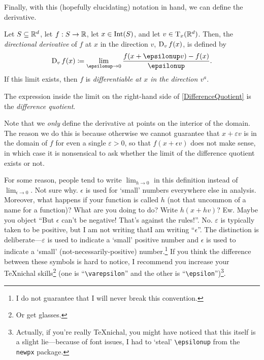 Finally, with this (hopefully elucidating) notation in hand, we can define the derivative.
\begin{dfn}\label{DirectionalDerivative}
Let $S\subseteq \R ^d$, let $f:S\rightarrow \R$, let $x\in \Int (S)$, and let $v\in \tangent{\R ^d}{x}$.  Then, the \emph{directional derivative} of $f$ at $x$ in the direction $v$, $\D _vf(x)$, is defined by
\begin{equation}\label{DifferenceQuotient}
\D _vf(x)\coloneqq \lim _{\epsilon \to 0}\frac{f(x+\epsilon v)-f(x)}{\epsilon}.
\end{equation}
If this limit exists, then $f$ is \emph{differentiable at $x$ in the direction $v^a$}.
\begin{rmk}
The expression inside the limit on the right-hand side of \eqref{DifferenceQuotient} is the \emph{difference quotient}.
\end{rmk}
\begin{rmk}
Note that we \emph{only} define the derivative at points on the interior of the domain.  The reason we do this is because otherwise we cannot guarantee that $x+\varepsilon v$ is in the domain of $f$ for even a single $\varepsilon >0$, so that $f(x+\epsilon v)$ does not make sense, in which case it is nonsensical to ask whether the limit of the difference quotient exists or not.
\end{rmk}
\begin{rmk}
For some reason, people tend to write $\lim _{h\to 0}$ in this definition instead of $\lim _{\epsilon \to 0}$.  Not sure why.  $\epsilon$ is used for `small' numbers everywhere else in analysis.  Moreover, what happens if your function is called $h$ (not that uncommon of a name for a function)?  What are you doing to do?  Write $h(x+hv)$?  Ew.  Maybe you object ``But $\epsilon$ can't be negative!  That's against the rules!''.  No.  $\varepsilon$ is typically taken to be positive, but I am not writing that\textellipsis I am writing ``$\epsilon$''.  The distinction is deliberate---$\varepsilon$ is used to indicate a `small' positive number and $\epsilon$ is used to indicate a `small' (not-necessarily-positive) number.\footnote{I do not guarantee that I will never break this convention.}  If you think the difference between these symbols is hard to notice, I recommend you increase your \TeX nichal skills\footnote{Or get glasses.} (one is ``\texttt{\textbackslash varepsilon}'' and the other is ``\texttt{\textbackslash epsilon}'')\footnote{Actually, if you're really \TeX nichal, you might have noticed that this itself is a slight lie---because of font issues, I had to `steal' \texttt{\textbackslash epsilonup} from the \texttt{newpx} package.}.
\end{rmk}
\end{dfn}
